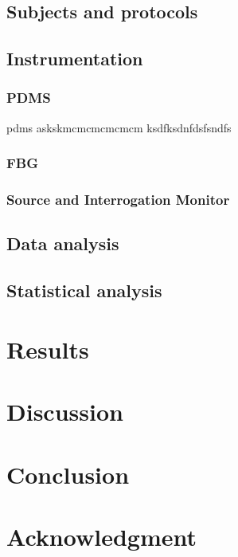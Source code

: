 \documentclass[conference]{IEEEtran}
\begin{document}
	\subsection{Subjects and protocols}
	
	
	\subsection{Instrumentation}
	\cite{dos}
	
	\subsubsection{PDMS}
	pdms askskmcmcmcmcmcm ksdfksdnfdsfsndfs
	
	
	\subsubsection{FBG}
	
	\subsubsection{Source and Interrogation Monitor}
	
	
	\subsection{Data analysis}
	
	
	\subsection{Statistical analysis}
	
	
	
	
	\section{Results}
	
	
	
	\section{Discussion}
	
	
	
	
	\section{Conclusion}
	
	
	
	
	\section*{Acknowledgment}
	
	

	\printbibliography
	
		
	
\end{document}
